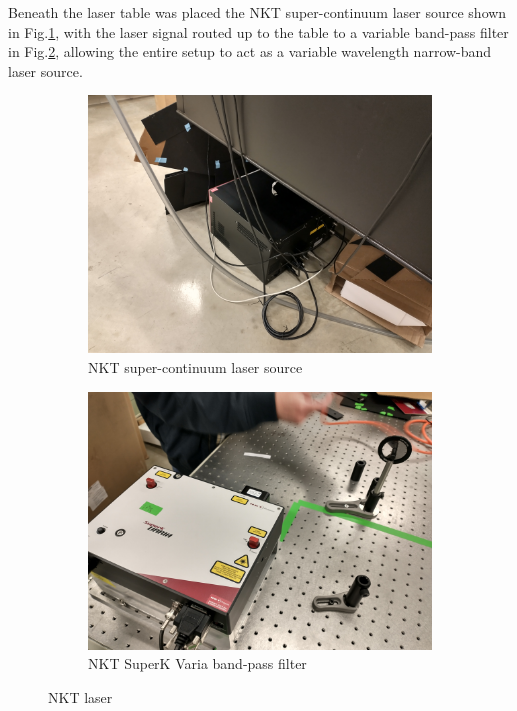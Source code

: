 \documentclass[a4paper]{article}
\begin{document}
Beneath the laser table was placed the NKT super-continuum laser source shown in Fig.\ref{fig:super_continuum}, with the laser signal routed up to the table to a variable band-pass filter in Fig.\ref{fig:band_pass}, allowing the entire setup to act as a variable wavelength narrow-band laser source.

\begin{figure}
     \centering
     \begin{subfigure}[b]{0.48\textwidth}
         \centering
         \includegraphics[width=\textwidth]{figures/IMG_20220422_134723634_HDR.jpg}
         \caption{NKT super-continuum laser source}
         \label{fig:super_continuum}
     \end{subfigure}
     \hfill
     \begin{subfigure}[b]{0.48\textwidth}
         \centering
         \includegraphics[width=\textwidth]{figures/IMG_20220422_134731107_HDR.jpg}
         \caption{NKT SuperK Varia band-pass filter}
         \label{fig:band_pass}
     \end{subfigure}
        \caption{NKT laser}
        \label{fig:NKT_laser_setup}
\end{figure}
\end{document}
